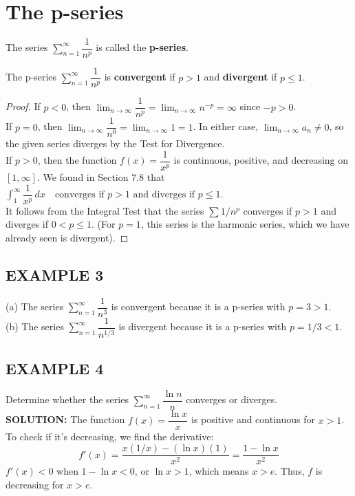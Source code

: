 \documentclass{article}
\theoremstyle{mystyle}
\begin{document}
\section*{The p-series}
The series \( \sum_{n=1}^{\infty} \dfrac{1}{n^p} \) is called the \textbf{p-series}.

\begin{tcolorbox}[
    colback=white,
    colframe=orange!80!white,
    title=Convergence of a p-series,
    boxrule=0.5mm,
    arc=3mm
    ]
    The p-series \( \sum_{n=1}^{\infty} \dfrac{1}{n^p} \) is \textbf{convergent} if \(p > 1\) and \textbf{divergent} if \(p \le 1\).
\end{tcolorbox}

\begin{proof}
If \(p < 0\), then \( \lim_{n\to\infty} \dfrac{1}{n^p} = \lim_{n\to\infty} n^{-p} = \infty \) since \(-p > 0\).\\
If \(p = 0\), then \( \lim_{n\to\infty} \dfrac{1}{n^0} = \lim_{n\to\infty} 1 = 1 \). In either case, \( \lim_{n\to\infty} a_n \neq 0 \), so the given series diverges by the Test for Divergence.\\
If \(p > 0\), then the function \( f(x) = \dfrac{1}{x^p} \) is continuous, positive, and decreasing on \([1, \infty]\). We found in Section 7.8 that
$ \int_1^\infty \dfrac{1}{x^p} \,dx \quad \text{converges if } p > 1 \text{ and diverges if } p \le 1.$\\
It follows from the Integral Test that the series \( \sum 1/n^p \) converges if \(p > 1\) and diverges if \(0 < p \le 1\). (For \(p=1\), this series is the harmonic series, which we have already seen is divergent).
\end{proof}

\subsection*{EXAMPLE 3}
(a) The series \( \sum_{n=1}^{\infty} \dfrac{1}{n^3} \) is convergent because it is a p-series with \(p = 3 > 1\). \\
(b) The series \( \sum_{n=1}^{\infty} \dfrac{1}{n^{1/3}} \) is divergent because it is a p-series with \(p = 1/3 < 1\).\\

\subsection*{EXAMPLE 4}
Determine whether the series \( \sum_{n=1}^{\infty} \dfrac{\ln n}{n} \) converges or diverges.\\
\textbf{SOLUTION:}
The function \(f(x) = \dfrac{\ln x}{x}\) is positive and continuous for \(x>1\). To check if it's decreasing, we find the derivative:
\[ f'(x) = \dfrac{x(1/x) - (\ln x)(1)}{x^2} = \dfrac{1 - \ln x}{x^2} \]
\(f'(x) < 0\) when \(1 - \ln x < 0\), or \(\ln x > 1\), which means \(x > e\). Thus, \(f\) is decreasing for \(x > e\).
\end{document}
